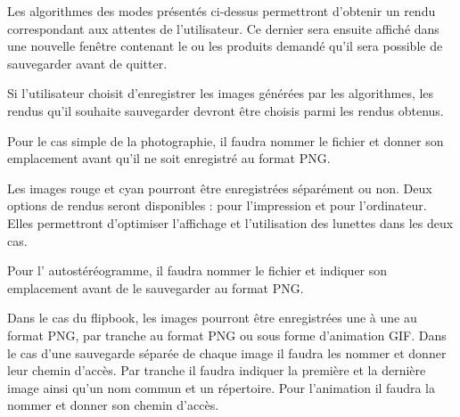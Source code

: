 \begin{description}[style=nextline]
	\item[Affichage du rendu]
	\mbox{\hspace{1cm}}Les algorithmes des modes présentés ci-dessus permettront d’obtenir un rendu correspondant aux attentes de l’utilisateur. Ce dernier sera ensuite affiché dans une nouvelle fenêtre contenant le ou les produits demandé qu’il sera possible de sauvegarder avant de quitter.
	
	\item[Enregistrement du rendu]
	\mbox{\hspace{1cm}} Si l’utilisateur choisit d’enregistrer les images générées par les algorithmes, les rendus qu’il souhaite sauvegarder devront être choisis parmi les rendus obtenus.
	
	\item[Enregistrement de la photographie]
	\mbox{\hspace{1cm}}	Pour le cas simple de la photographie, il faudra nommer le fichier et donner son emplacement avant qu’il ne soit enregistré au format PNG.
	
	\item[Enregistrement de l'anaglyphe]
	\mbox{\hspace{1cm}} Les images rouge et cyan pourront être enregistrées séparément ou non. Deux options de rendus seront disponibles : pour l’impression et pour l’ordinateur. Elles permettront d’optimiser l’affichage et l’utilisation des lunettes dans les deux cas. 
	
	\item[Enregistrement de l'autostéréogramme]
	\mbox{\hspace{1cm}}	Pour l' autostéréogramme, il faudra nommer le fichier et indiquer son emplacement avant de le sauvegarder au format PNG.
	
	\item[Enregistrement du flipbook]
	\mbox{\hspace{1cm}}Dans le cas du flipbook, les images pourront être enregistrées une à une au format PNG, par tranche au format PNG ou sous forme d’animation GIF. Dans le cas d’une sauvegarde séparée de chaque image il faudra les nommer et donner leur chemin d’accès. Par tranche il faudra indiquer la première et la dernière image ainsi qu’un nom commun et un répertoire. Pour l’animation il faudra la nommer et donner son chemin d’accès. 
\end{description}
